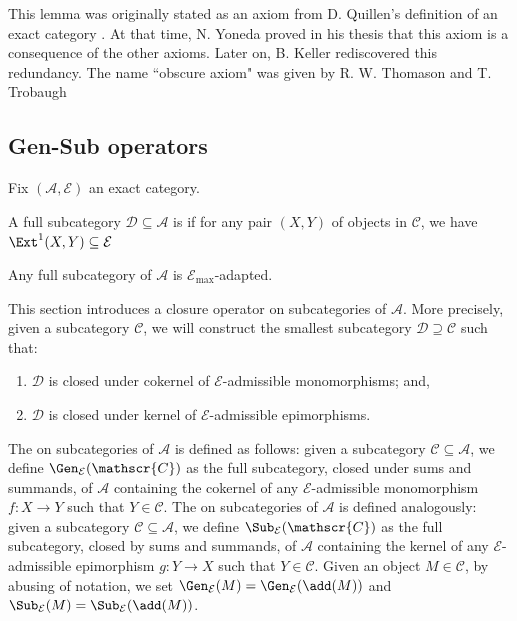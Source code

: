 \begin{remark} \label{rem:obscure}
    This lemma was originally stated as an axiom from D. Quillen's definition of an exact category \cite{Q73}. At that time, N. Yoneda proved in his thesis \cite{Y61} that this axiom is a consequence of the other axioms. Later on, B. Keller \cite{K90} rediscovered this redundancy. The name ``obscure axiom" was given by R. W. Thomason and T. Trobaugh \cite{TT07}
\end{remark}

\subsection{Gen-Sub operators}
\label{ss:GenSuboperators}

Fix $(\mathscr{A},\mathcal{E})$ an exact category. 

\begin{definition} \label{def:Eadpted}
    A full subcategory $\mathscr{D} \subseteq \mathscr{A}$ is  if for any pair $(X,Y)$ of objects in $\mathscr{C}$, we have $\Ext^1(X,Y) \subseteq \mathcal{E}$
\end{definition}
\begin{ex} Any full subcategory of $\mathscr{A}$ is $\mathcal{E}_{\max}$-adapted.
\end{ex}
This section introduces a closure operator on subcategories of $\mathscr{A}$. More precisely, given a subcategory $\mathscr{C}$, we will construct the smallest subcategory $\mathscr{D} \supseteq \mathscr{C}$ such that:
\begin{enumerate}[label=$\bullet$,itemsep=1mm]
    \item $\mathscr{D}$ is closed under cokernel of $\mathcal{E}$-admissible monomorphisms; and,
    \item  $\mathscr{D}$ is closed under kernel of $\mathcal{E}$-admissible epimorphisms.
\end{enumerate}

The  on subcategories of $\mathscr{A}$ is defined as follows: given a subcategory $\mathscr{C} \subseteq \mathscr{A}$, we define $\Gen_\mathcal{E}(\mathscr{C})$ as the full subcategory, closed under sums and summands, of $\mathscr{A}$ containing the cokernel of any $\mathcal{E}$-admissible monomorphism $f : X \longrightarrow Y$ such that $Y \in \mathscr{C}$. The  on subcategories of $\mathscr{A}$ is defined analogously: given a subcategory $\mathscr{C} \subseteq \mathscr{A}$, we define $\Sub_\mathcal{E}(\mathscr{C})$ as the full subcategory, closed by sums and summands, of $\mathscr{A}$ containing the kernel of any $\mathcal{E}$-admissible epimorphism $g : Y \longrightarrow X$  such that $Y \in \mathscr{C}$. Given an object $M \in \mathscr{C}$, by abusing of notation, we set $\Gen_\mathcal{E}(M) = \Gen_\mathcal{E}(\add(M))$ and $\Sub_\mathcal{E}(M) = \Sub_\mathcal{E}(\add(M))$.

